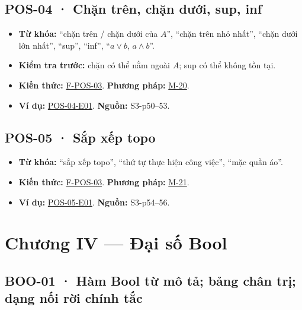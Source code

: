 \documentclass[
  10pt,
  twoside,openany]{book}
\providecommand{\tightlist}{%
  \setlength{\itemsep}{0pt}\setlength{\parskip}{0pt}}
\begin{document}
\hypertarget{POS-04}{%
\subsection{POS-04 · Chặn trên, chặn dưới, sup, inf}\label{POS-04}}

\begin{itemize}
\tightlist
\item
  \textbf{Từ khóa:} ``chặn trên / chặn dưới của \(A\)'', ``chặn trên nhỏ
  nhất'', ``chặn dưới lớn nhất'', ``sup'', ``inf'', ``\(a\vee b\),
  \(a\wedge b\)''.
\item
  \textbf{Kiểm tra trước:} chặn có thể nằm ngoài \(A\); sup có thể không
  tồn tại.
\item
  \textbf{Kiến thức:} \protect\hyperlink{F-POS-03}{F-POS-03}.
  \textbf{Phương pháp:} \protect\hyperlink{M-20}{M-20}.
\item
  \textbf{Ví dụ:} \protect\hyperlink{POS-04-E01}{POS-04-E01}.
  \textbf{Nguồn:} S3-p50--53.
\end{itemize}

\hypertarget{POS-05}{%
\subsection{POS-05 · Sắp xếp topo}\label{POS-05}}

\begin{itemize}
\tightlist
\item
  \textbf{Từ khóa:} ``sắp xếp topo'', ``thứ tự thực hiện công việc'',
  ``mặc quần áo''.
\item
  \textbf{Kiến thức:} \protect\hyperlink{F-POS-03}{F-POS-03}.
  \textbf{Phương pháp:} \protect\hyperlink{M-21}{M-21}.
\item
  \textbf{Ví dụ:} \protect\hyperlink{POS-05-E01}{POS-05-E01}.
  \textbf{Nguồn:} S3-p54--56.
\end{itemize}

\hypertarget{chux1b0ux1a1ng-iv-ux111ux1ea1i-sux1ed1-bool}{%
\section{Chương IV --- Đại số
Bool}\label{chux1b0ux1a1ng-iv-ux111ux1ea1i-sux1ed1-bool}}

\hypertarget{BOO-01}{%
\subsection{BOO-01 · Hàm Bool từ mô tả; bảng chân trị; dạng nối rời
chính tắc}\label{BOO-01}}
\end{document}
